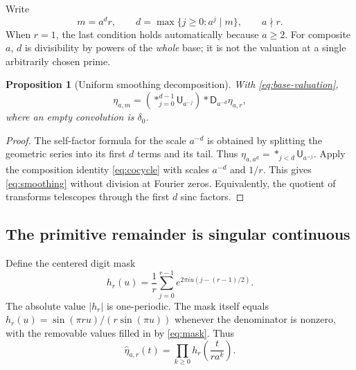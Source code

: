 \documentclass[11pt,a4paper]{article}
\newtheorem{proposition}[theorem]{Proposition}
\theoremstyle{definition}
\theoremstyle{remark}
\newcommand{\D}{\mathsf D}
\newcommand{\Unif}{\mathsf U}
\begin{document}
Write
\begin{equation}\label{eq:base-valuation}
 m=a^d r,\qquad d=\max\{j\ge0:a^j\mid m\},\qquad a\nmid r.
\end{equation}
When $r=1$, the last condition holds automatically because $a\ge2$.
For composite $a$, $d$ is divisibility by powers of the \emph{whole} base;
it is not the valuation at a single arbitrarily chosen prime.

\begin{proposition}[Uniform smoothing decomposition]\label{prop:smoothing}
With \eqref{eq:base-valuation},
\begin{equation}\label{eq:smoothing}
 \eta_{a,m}=
 \left(\mathop{*}_{j=0}^{d-1}\Unif_{a^{-j}}\right)
 *\D_{a^{-d}}\eta_{a,r},
\end{equation}
where an empty convolution is $\delta_0$.
\end{proposition}
\begin{proof}
The self-factor formula for the scale $a^{-d}$ is obtained by splitting
the geometric series into its first $d$ terms and its tail. Thus
$\eta_{a,a^d}=\mathop{*}_{j<d}\Unif_{a^{-j}}$.
Apply the composition identity \eqref{eq:cocycle} with scales $a^{-d}$
and $1/r$. This gives \eqref{eq:smoothing} without division at Fourier zeros.
Equivalently, the quotient of transforms telescopes through the first $d$
sinc factors.
\end{proof}

\subsection{The primitive remainder is singular continuous}
Define the centered digit mask
\begin{equation}\label{eq:mask}
 h_r(u)=\frac1r\sum_{j=0}^{r-1}e^{2\pi iu(j-(r-1)/2)}.
\end{equation}
The absolute value $|h_r|$ is one-periodic. The mask itself equals
$h_r(u)=\sin(\pi ru)/(r\sin(\pi u))$ whenever the denominator is nonzero,
with the removable values filled in by \eqref{eq:mask}. Thus
\begin{equation}\label{eq:eta-transform}
 \widehat\eta_{a,r}(t)=\prod_{k\ge0}h_r\left(\frac{t}{ra^k}\right).
\end{equation}
\end{document}
